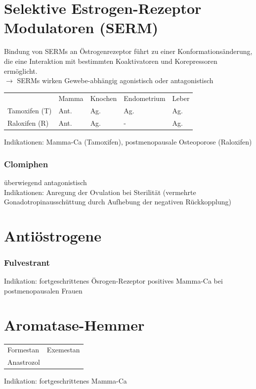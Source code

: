 \documentclass[10pt,a4paper]{report}
\begin{document}
\section{Selektive Estrogen-Rezeptor Modulatoren (SERM)} %
\label{sec:selektive_estrogen_rezeptor_modulatoren_serm_}
Bindung von SERMs an Östrogenrezeptor führt zu einer Konformationsänderung, die eine Interaktion mit bestimmten Koaktivatoren und Korepressoren ermöglicht.\\
$\rightarrow$ SERMs wirken Gewebe-abhängig agonistisch oder antagonistisch\\
\begin{tabularx}{\textwidth}{XXXXX}
&Mamma&Knochen&Endometrium&Leber\\
Tamoxifen (T)&Ant.&Ag.&Ag.&Ag.\\
Raloxifen (R)&Ant.&Ag.&-&Ag.\\
\end{tabularx}
Indikationen: Mamma-Ca (Tamoxifen), postmenopausale Osteoporose (Raloxifen)
\subsubsection{Clomiphen} %
\label{par:clomiphen}
überwiegend antagonistisch\\
Indikationen: Anregung der Ovulation bei Sterilität (vermehrte Gonadotropinausschüttung durch Aufhebung der negativen Rückkopplung)
\section{Antiöstrogene} %
\label{sec:anti_strogene}
\subsubsection{Fulvestrant} %
\label{par:fulvestrant}
Indikation: fortgeschrittenes Ösrogen-Rezeptor positives Mamma-Ca bei postmenopausalen Frauen
\section{Aromatase-Hemmer} %
\label{sec:aroma}
\begin{tabularx}{\textwidth}{XX}
Formestan&Exemestan\\
Anastrozol&\\
\end{tabularx}
Indikation: fortgeschrittenes Mamma-Ca 
\end{document}
